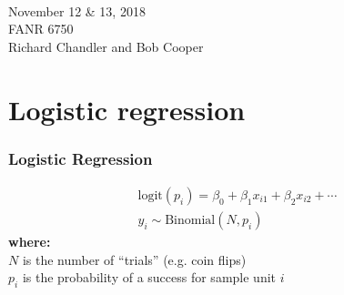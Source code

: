 \documentclass[color=usenames,dvipsnames]{beamer}\usepackage[]{graphicx}\usepackage[]{color}
\begin{document}




\begin{frame}[plain]
  \huge
  \centering \par
  {\color{RoyalBlue}{Lab 13 -- Generalized Linear Models}} \\
  \vspace{1cm}
  \LARGE
  November 12 \& 13, 2018 \\
  FANR 6750 \\
  \vfill
  \large
  Richard Chandler and Bob Cooper
\end{frame}





\section{Logistic regression}


\begin{frame}
  \frametitle{Logistic Regression}
  \large
    \begin{gather*}
      \mathrm{logit}(p_i) = \beta_0 + \beta_1 x_{i1} + \beta_2 x_{i2} + \cdots \\
      y_i \sim \mathrm{Binomial}(N, p_i)
  \end{gather*}
  \pause
  {\bf where: \\}
  $N$ is the number of ``trials'' (e.g. coin flips) \\
  $p_i$ is the probability of a success for sample unit $i$
\end{frame}
\end{document}
